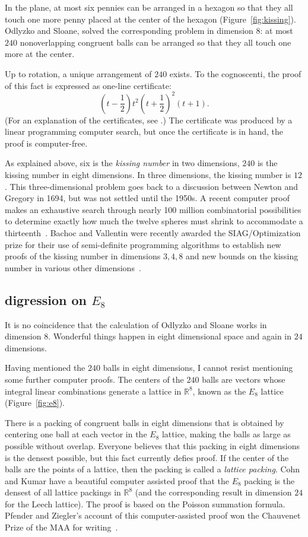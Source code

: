 \documentclass{llncs}
\newcommand{\ring}[1]{\mathbb{#1}}
\begin{document}
In the plane, at most six pennies can be arranged in a hexagon so that
they all touch one more penny placed at the center of the hexagon
(Figure~\ref{fig:kissing}).  Odlyzko and Sloane, solved the
corresponding problem in dimension $8$: at most $240$ nonoverlapping
congruent balls can be arranged so that they all touch one more at the
center.

Up to rotation, a unique arrangement of $240$ exists.  To the
cognoscenti, the proof of this fact is expressed as one-line
certificate:
\[
(t - \frac{1}{2})t^2(t + \frac{1}{2})^2 (t + 1).
\]
(For an explanation of the certificates, see \cite{PZ}.)  The
certificate was produced by a linear programming computer search, but
once the certificate is in hand, the proof is computer-free.

As explained above, six is the {\it kissing number} in two dimensions,
$240$ is the kissing number in eight dimensions. In three dimensions,
the kissing number is $12$.  This three-dimensional problem goes back
to a discussion between Newton and Gregory in 1694, but was not
settled until the 1950s.  A recent computer proof makes an exhaustive
search through nearly 100 million combinatorial possibilities to
determine exactly how much the twelve spheres must shrink to
accommodate a thirteenth~\cite{Musin-Tarasov}.  Bachoc and Vallentin
were recently awarded the SIAG/Optimization prize for their use of
semi-definite programming algorithms to establish new proofs of the
kissing number in dimensions $3,4,8$ and new bounds on the kissing
number in various other dimensions~\cite{BV08}.



\subsection{digression on $E_8$}\label{sec:e8}

It is no coincidence that the calculation of Odlyzko and Sloane works
in dimension $8$.  Wonderful things happen in eight dimensional space
and again in $24$ dimensions.

Having mentioned the $240$ balls in eight dimensions, I cannot resist
mentioning some further computer proofs.  The centers of the $240$ balls
are vectors whose integral linear combinations generate 
a lattice in $\ring{R}^8$, known as the $E_8$ lattice (Figure~\ref{fig:e8}).

There is a packing of congruent balls in eight dimensions that is
obtained by centering one ball at each vector in the $E_8$ lattice,
making the balls as large as possible without overlap.  Everyone
believes that this packing in eight dimensions is the densest
possible, but this fact currently defies proof.  If the center of the
balls are the points of a lattice, then the packing is called a {\it
  lattice packing}.  Cohn and Kumar have a beautiful computer assisted
proof that the $E_8$ packing is the densest of all lattice packings in
$\ring{R}^8$ (and the corresponding result in dimension $24$ for the
Leech lattice).  The proof is based on the Poisson summation formula.
Pfender and Ziegler's account of this computer-assisted proof won the
Chauvenet Prize of the MAA for writing~\cite{PZ}.
\end{document}
